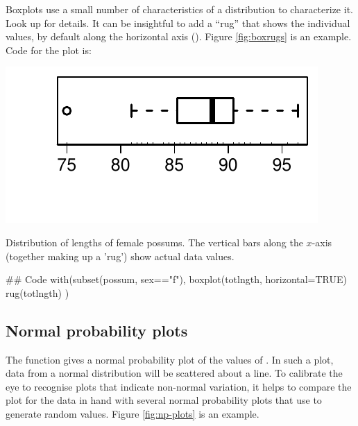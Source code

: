 Boxplots use a small number of characteristics of a distribution to
characterize it. Look up  for details.
It can be insightful to add a ``rug'' that shows the individual values,
by default along the horizontal axis ().
Figure \ref{fig:boxrugs} is an example.  Code for the plot is:
\begin{marginfigure}
\begin{Schunk}


\centerline{\includegraphics[width=\textwidth]{figs/07-boxplot-1} }

\end{Schunk}
\vspace*{-12pt}

\caption{Distribution of lengths of female possums.  The 
 vertical bars along the $x$-axis (together making up a 'rug')
 show actual data values.\label{fig:boxrugs}}
\end{marginfigure}

\begin{Schunk}
\begin{Sinput}
## Code
with(subset(possum, sex=="f"),
     {boxplot(totlngth, horizontal=TRUE)
      rug(totlngth)} )
\end{Sinput}
\end{Schunk}

\subsection*{Normal probability plots}

The function  gives a normal probability plot of the
values of . In such a plot, data from a normal distribution
will be scattered about a line.  To calibrate the eye to recognise
plots that indicate non-normal variation, it helps to compare the plot
for the data in hand with several normal probability plots that use
 to generate random values.  Figure \ref{fig:np-plots}
is an example.

